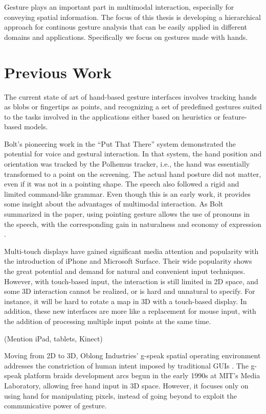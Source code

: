 Gesture plays an important part in multimodal interaction, especially for
conveying spatial information. The focus of this thesis is developing a
hierarchical approach for continous gesture analysis that can be easily
applied in different domains and applications. Specifically we focus on gestures
made with hands.

\section{Previous Work}
The current state of art of hand-based gesture interfaces involves tracking
hands as blobs or fingertips as points, and recognizing a set of
predefined gestures suited to the tasks involved in the applications
either based on heuristics or feature-based models.

Bolt's pioneering work in the ``Put That There'' system \cite{Bolt80} demonstrated the potential for voice and gestural interaction.  In that system, the hand position and orientation was tracked by the Polhemus tracker, i.e., the hand was essentially transformed to a point on the screening. The actual hand posture did not matter, even if it was not in a pointing shape. The speech also followed a rigid and limited command-like grammar. Even though this is an early work, it provides some insight about the advantages of multimodal interaction. As Bolt summarized in the paper, using pointing gesture allows the use of pronouns in the speech, with the corresponding gain in naturalness and economy of expression \cite{Bolt80}. 

Multi-touch displays have gained significant media attention and popularity with the introduction of iPhone\textsuperscript{\textregistered} and Microsoft Surface\textsuperscript{\textregistered}. Their wide popularity shows the great potential and demand for natural and convenient input techniques. However, with touch-based input, the interaction is still limited in 2D space, and some 3D interaction cannot be realized, or is hard and unnatural to specify. For instance, it will be hard to rotate a map in 3D with a touch-based display. In addition, these new interfaces are more like a replacement for mouse input, with the addition of processing multiple input points at the same time. 

(Mention iPad, tablets, Kinect)

Moving from 2D to 3D, Oblong Industries' g-speak spatial operating environment addresses the constriction of human intent imposed by traditional GUIs \cite{Oblong09}. The g-speak platform braids development arcs begun in the early 1990s at MIT's Media Laboratory, allowing free hand input in 3D space. However, it focuses only on using hand for manipulating pixels, instead of going beyond to exploit the communicative power of gesture. 

